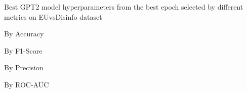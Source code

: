 \begin{table}[!htbp]
    \caption{Best GPT2 model hyperparameters from the best epoch selected by different metrics on EUvsDisinfo dataset}
    \label{tab:euvsdisinfo_gpt2_hparams}
    \centering

    \begin{subtable}[t]{0.48\linewidth}
        \scriptsize
        \caption{By Accuracy}
        
    \end{subtable}
    \hfill
    \begin{subtable}[t]{0.48\linewidth}
        \scriptsize
        \caption{By F1-Score}
        
    \end{subtable}

    \vspace{1em}

    \begin{subtable}[t]{0.48\linewidth}
        \scriptsize
        \caption{By Precision}
        
    \end{subtable}
    \hfill
    \begin{subtable}[t]{0.48\linewidth}
        \scriptsize
        \caption{By ROC-AUC}
        
    \end{subtable}


\end{table}